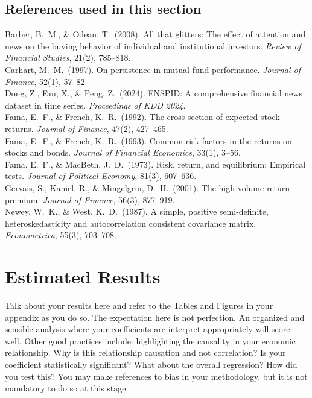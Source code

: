 \documentclass[11pt]{article}
\begin{document}
\subsection*{References used in this section}
\small
Barber, B.\ M., \& Odean, T.\ (2008). All that glitters: The effect of attention and news on the buying behavior of individual and institutional investors. \emph{Review of Financial Studies}, 21(2), 785--818.\\
Carhart, M.\ M.\ (1997). On persistence in mutual fund performance. \emph{Journal of Finance}, 52(1), 57--82.\\
Dong, Z., Fan, X., \& Peng, Z.\ (2024). FNSPID: A comprehensive financial news dataset in time series. \emph{Proceedings of KDD 2024}.\\
Fama, E.\ F., \& French, K.\ R.\ (1992). The cross-section of expected stock returns. \emph{Journal of Finance}, 47(2), 427--465.\\
Fama, E.\ F., \& French, K.\ R.\ (1993). Common risk factors in the returns on stocks and bonds. \emph{Journal of Financial Economics}, 33(1), 3--56.\\
Fama, E.\ F., \& MacBeth, J.\ D.\ (1973). Risk, return, and equilibrium: Empirical tests. \emph{Journal of Political Economy}, 81(3), 607--636.\\
Gervais, S., Kaniel, R., \& Mingelgrin, D.\ H.\ (2001). The high-volume return premium. \emph{Journal of Finance}, 56(3), 877--919.\\
Newey, W.\ K., \& West, K.\ D.\ (1987). A simple, positive semi-definite, heteroskedasticity and autocorrelation consistent covariance matrix. \emph{Econometrica}, 55(3), 703--708.

\section{Estimated Results}
Talk about your results here and refer to the Tables and Figures in your appendix as you do so. The expectation here is not perfection. An organized and sensible analysis where your coefficients are interpret appropriately will score well. Other good practices include: highlighting the causality in your economic relationship. Why is this relationship causation and not correlation? Is your coefficient statistically significant? What about the overall regression? How did you test this? You may make references to bias in your methodology, but it is not mandatory to do so at this stage. 
\end{document}
